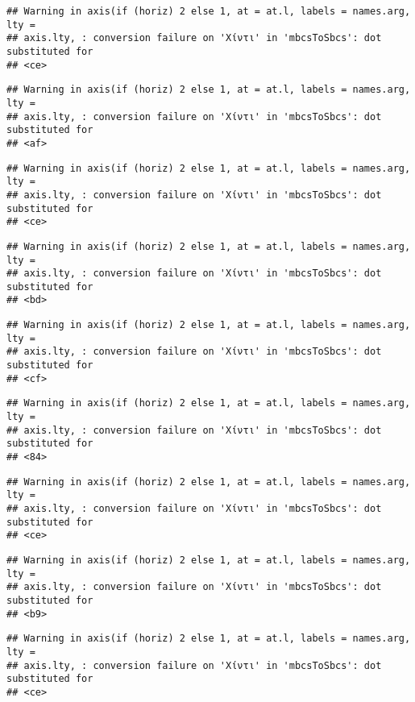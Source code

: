 \documentclass[
]{article}
\begin{document}
\begin{verbatim}
## Warning in axis(if (horiz) 2 else 1, at = at.l, labels = names.arg, lty =
## axis.lty, : conversion failure on 'Χίντι' in 'mbcsToSbcs': dot substituted for
## <ce>
\end{verbatim}

\begin{verbatim}
## Warning in axis(if (horiz) 2 else 1, at = at.l, labels = names.arg, lty =
## axis.lty, : conversion failure on 'Χίντι' in 'mbcsToSbcs': dot substituted for
## <af>
\end{verbatim}

\begin{verbatim}
## Warning in axis(if (horiz) 2 else 1, at = at.l, labels = names.arg, lty =
## axis.lty, : conversion failure on 'Χίντι' in 'mbcsToSbcs': dot substituted for
## <ce>
\end{verbatim}

\begin{verbatim}
## Warning in axis(if (horiz) 2 else 1, at = at.l, labels = names.arg, lty =
## axis.lty, : conversion failure on 'Χίντι' in 'mbcsToSbcs': dot substituted for
## <bd>
\end{verbatim}

\begin{verbatim}
## Warning in axis(if (horiz) 2 else 1, at = at.l, labels = names.arg, lty =
## axis.lty, : conversion failure on 'Χίντι' in 'mbcsToSbcs': dot substituted for
## <cf>
\end{verbatim}

\begin{verbatim}
## Warning in axis(if (horiz) 2 else 1, at = at.l, labels = names.arg, lty =
## axis.lty, : conversion failure on 'Χίντι' in 'mbcsToSbcs': dot substituted for
## <84>
\end{verbatim}

\begin{verbatim}
## Warning in axis(if (horiz) 2 else 1, at = at.l, labels = names.arg, lty =
## axis.lty, : conversion failure on 'Χίντι' in 'mbcsToSbcs': dot substituted for
## <ce>
\end{verbatim}

\begin{verbatim}
## Warning in axis(if (horiz) 2 else 1, at = at.l, labels = names.arg, lty =
## axis.lty, : conversion failure on 'Χίντι' in 'mbcsToSbcs': dot substituted for
## <b9>
\end{verbatim}

\begin{verbatim}
## Warning in axis(if (horiz) 2 else 1, at = at.l, labels = names.arg, lty =
## axis.lty, : conversion failure on 'Χίντι' in 'mbcsToSbcs': dot substituted for
## <ce>
\end{verbatim}
\end{document}

